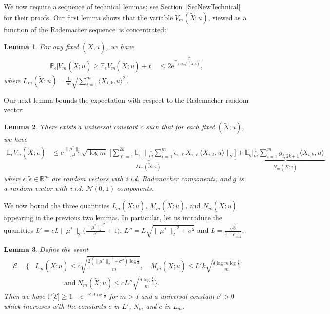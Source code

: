 \documentclass[twoside,11pt]{article}
\newtheorem{lems}{Lemma}
\newcommand{\NORMAL}{\ensuremath{\mathcal{N}}}
\def\EE{ \mathbb{E} }
\def\E{ \mathrm{e} }							%
\newcommand{\norm}[1]{\ensuremath{\|#1\|_2}}
\newcommand{\mixcoef}{\ensuremath{\rho_{\mathrm{mix}}}}
\newcommand{\paramobs}{\mu}
\newcommand{\trueparamobs}{\ensuremath{\paramobs^*}}
\newcommand{\mprob}{\ensuremath{\mathbb{P}}}
\newcommand{\real}{\ensuremath{\mathbb{R}}}
\newcommand{\kdim}{\ensuremath{k}}
\newcommand{\Xtil}{\ensuremath{\widetilde{X}}}
\newcommand{\processradobs}{\ensuremath{V_m}}
\newcommand{\lipproc}{\ensuremath{L_m}}
\newcommand{\epsilontwo}{\tilde{\epsilon}}
\newcommand{\lipcont}{\ensuremath{L}}
\newcommand{\processradM}{\ensuremath{M_m}}
\newcommand{\processradN}{\ensuremath{N_m}}
\begin{document}
We now require a sequence of technical lemmas; see
Section~\ref{SecNewTechnical} for their proofs.  Our first lemma shows
that the variable $\processradobs(\Xtil; u)$, viewed as a function of
the Rademacher sequence, is concentrated:
\begin{lems}
\label{LemConcLipproc}
For any fixed $(\Xtil,u)$, we have
\begin{align}
\mprob_{\epsilon} \big[ \processradobs(\Xtil;u) \geq \EE_{\epsilon}
  \processradobs(\Xtil;u) + t \big] & \leq 2 \E^{-\frac{t^2}{16
    \lipproc^2(\Xtil;u)}},
\end{align}
where $\lipproc(\Xtil;u) = \frac{1}{m} \sqrt{\sum_{i=1}^m \langle
  X_{i,k},u\rangle^2}$.
\end{lems}  


\noindent Our next lemma bounds the expectation with respect to the
Rademacher random vector:
%
\begin{lems}
\label{LemContractions}
There exists a universal constant $c$ such that for each fixed
$(\Xtil;u)$, we have
\begin{align}
\label{EqnExp}
\EE_{\epsilon} \processradobs(\Xtil;u) &\leq \underbrace{c
  \frac{\norm{\trueparamobs}}{\sigma^2} \sqrt{\log m} \; \Big[
    \sum_{\ell=1}^{2k} \EE_{\epsilontwo}\norm{\frac{1}{m} \sum_{i=1}^m
      \epsilontwo_{i,\ell} X_{i,\ell} \langle X_{i,k},u\rangle}
    \Big]}_{ \processradM (\Xtil;u)} + \underbrace{\EE_g
  \big|\frac{1}{m}\sum_{i=1}^m g_{i,2k+1} \langle X_{i,k},
  u\rangle\big|}_{\processradN(\Xtil;u)}
\end{align}
where $\epsilon, \epsilontwo \in \real^m$ are random vectors with
i.i.d. Rademacher components, and $g$ is a random vector with
i.i.d. $\NORMAL(0,1)$ components.
\end{lems}

We now bound the three quantities $\lipproc(\Xtil;u)$,
$\processradM(\Xtil;u)$, and $\processradN(\Xtil;u)$ appearing in the
previous two lemmas.  In particular, let us introduce the quantities
$L' = c \lipcont \norm{\trueparamobs}\big(
\frac{\norm{\trueparamobs}^2}{\sigma^2}+1\big)$, $L'' = \lipcont
\sqrt{\norm{\trueparamobs}^2+\sigma^2} $ and $\lipcont =
\frac{\sqrt{8}}{1-\mixcoef}$.


\begin{lems}
\label{LemEventBound}
Define the event
\begin{align*}
\mathcal{E} =\Biggr \{ &\lipproc(\Xtil;u) \leq
\tilde{c} \sqrt{\frac{2(\norm{\trueparamobs}^2 + \sigma^2)\log
    \frac{1}{\delta}}{m}}, \quad \processradM(\Xtil;u) \leq L'
k\sqrt{\frac{d\log m \log \frac{\kdim}{\delta}}{m}}\\ & \qquad \qquad
\mbox{ and } \processradN(\Xtil;u) \leq c L'' \sqrt{\frac{d \log
    \frac{1}{\delta}}{m}} \Biggr\}.
\end{align*}
Then we have $\mprob \big[ \mathcal{E} \big] \geq 1 - \E^{-c' \; d \log \frac{1}{\delta}}$ 
for $m > d$ and a universal constant $c' > 0$ which increases with the constants $c$
in $L'$, $\processradN$ and $\tilde{c}$ in $\lipproc$.
\end{lems}
\end{document}
